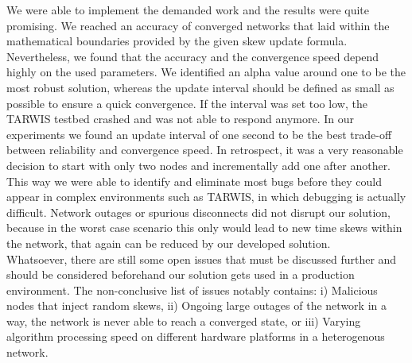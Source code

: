 \documentclass{llncs}
\begin{document}
We were able to implement the demanded work and the results were quite promising. We reached an accuracy of converged networks that laid within the mathematical boundaries provided by the given skew update formula. Nevertheless, we found that the accuracy and the convergence speed depend highly on the used parameters. We identified an alpha value around one to be the most robust solution, whereas the update interval should be defined as small as possible to ensure a quick convergence. If the interval was set too low, the TARWIS testbed crashed and was not able to respond anymore. In our experiments we found an update interval of one second to be the best trade-off between reliability and convergence speed. In retrospect, it was a very reasonable decision to start with only two nodes and incrementally add one after another. This way we were able to identify and eliminate most bugs before they could appear in complex environments such as TARWIS, in which debugging is actually difficult. Network outages or spurious disconnects did not disrupt our solution, because in the worst case scenario this only would lead to new time skews within the network, that again can be reduced by our developed solution.\\
\indent Whatsoever, there are still some open issues that must be discussed further and should be considered beforehand our solution gets used in a production environment. The non-conclusive list of issues notably contains: i) Malicious nodes that inject random skews, ii) Ongoing large outages of the network in a way, the network is never able to reach a converged state, or iii) Varying algorithm processing speed on different hardware platforms in a heterogenous network.

{}



%
%
\end{document}
